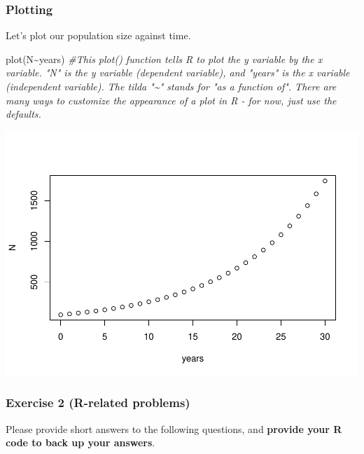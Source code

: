 \documentclass[
]{article}
\newenvironment{Shaded}{\begin{snugshade}}{\end{snugshade}}
\newcommand{\CommentTok}[1]{\textcolor[rgb]{0.56,0.35,0.01}{\textit{#1}}}
\newcommand{\FunctionTok}[1]{\textcolor[rgb]{0.00,0.00,0.00}{#1}}
\newcommand{\NormalTok}[1]{#1}
\newcommand{\SpecialCharTok}[1]{\textcolor[rgb]{0.00,0.00,0.00}{#1}}
\begin{document}
\hypertarget{plotting}{%
\subsubsection{Plotting}\label{plotting}}

Let's plot our population size against time.

\begin{Shaded}
\begin{Highlighting}[]
\FunctionTok{plot}\NormalTok{(N}\SpecialCharTok{\textasciitilde{}}\NormalTok{years)   }\CommentTok{\#This plot() function tells R to plot the y variable by the x variable. "N" is the y variable (dependent variable), and "years" is the x variable (independent variable). The tilda "\textasciitilde{}" stands for "as a function of". There are many ways to customize the appearance of a plot in R {-} for now, just use the defaults.}
\end{Highlighting}
\end{Shaded}

\includegraphics{LAB1_files/figure-latex/unnamed-chunk-7-1.pdf}

\hypertarget{exercise-2-r-related-problems}{%
\subsubsection{Exercise 2 (R-related
problems)}\label{exercise-2-r-related-problems}}

Please provide short answers to the following questions, and
\textbf{provide your R code to back up your answers}.
\end{document}
